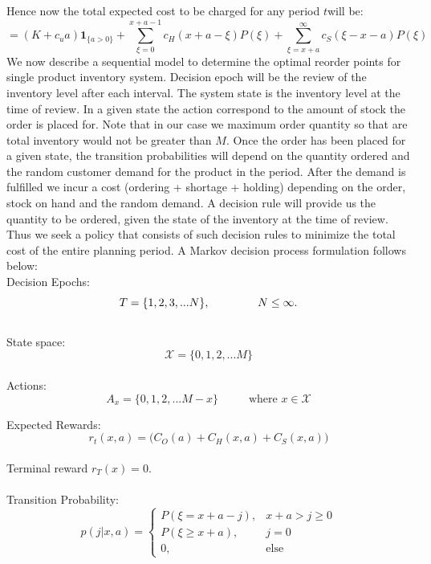 \documentclass[11pt,a4paper,oneside]{report}
\begin{document}
Hence now the total expected cost to be charged for any period $t$will be:
\begin{equation}
= (K+ c_u {a})\mathbf{1}_{\lbrace a>0\rbrace} + \sum_{\xi=0}^{x+a-1}c_H(x+a-\xi)P(\xi) + \sum_{\xi=x+a}^{\infty}c_S(\xi-x-a)P(\xi)
\end{equation} 
We now describe a sequential model to determine the optimal reorder points for single product inventory system. Decision epoch will be the review of the inventory level after each interval. The system state is the inventory level at the time of review. In a given state the action correspond to the amount of stock the order is placed for. Note that in our case we maximum order quantity so that are total inventory would not be greater than $M$. Once the order has been placed for a given state, the transition probabilities will depend on the quantity ordered and the random customer demand for the product in the period. After the demand is fulfilled we incur a cost (ordering + shortage + holding) depending on the order, stock on hand and the random demand. A decision rule will provide us the quantity to be ordered, given the state of the inventory at the time of review. Thus we seek a policy that consists of such decision rules to minimize the total cost of the entire planning period. 
A Markov decision process formulation follows below:\\

\noindent Decision Epochs:\\
\begin{equation*}T = \lbrace 1,2,3,...N \rbrace,\hspace{1.5cm}   N \leq \infty. 
\end{equation*}\\
\noindent State space:\\
\begin{equation*}\mathcal{X} = \lbrace 0,1,2,...M \rbrace  
\end{equation*}\\
\noindent Actions:\\
\begin{equation*}A_x  = \lbrace0,1,2,...M-x \rbrace \hspace{1cm} \text{ where } x\in \mathcal{X}
\end{equation*}

\noindent Expected Rewards:\\
\begin{equation*}r_t(x,a) = \big(C_O(a) + C_H(x,a) + C_S(x,a)\big) 
\end{equation*}\\
\noindent Terminal reward $r_T(x)=0$.\\
\noindent \\Transition Probability:\\
\begin{equation*}
p(j|x,a)=
\begin{cases}
P(\xi= x+a-j),&{x+a}>j\geq0\\
P(\xi\geq x+a),&j=0\\
0,&\text{else}
\end{cases}
\end{equation*}
\end{document}
